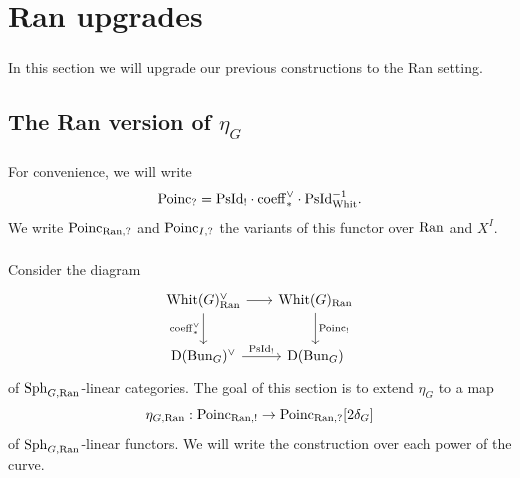 \section{Ran upgrades}
\label{section:Ran_upgrades}

\subsubsection{} In this section we will upgrade our previous constructions to the Ran setting.

\subsection{The Ran version of $\eta_G$}

\subsubsection{} For convenience, we will write
  \[\mathrm{Poinc}_? = \mathrm{PsId}_! \cdot \mathrm{coeff}_*^\vee \cdot \mathrm{PsId}_{\mathrm{Whit}}^{-1}.\]
We write $\mathrm{Poinc}_{\mathrm{Ran},?}$ and $\mathrm{Poinc}_{I,?}$ the variants of this functor over $\mathrm{Ran}$ and $X^I$.

\subsubsection{} Consider the diagram
\[
\begin{tikzcd}[
  column sep={8em,between origins},
  row sep={4em,between origins}
]
  \Whit(G)_\Ran^\vee \arrow[r] \arrow[d, "\coeff_*^\vee" left] & \Whit(G)_\Ran \arrow[d, "\Poinc_!"] \\
  \DMod(\Bun_G)^\vee \arrow[r, "\PsId_!"] & \DMod(\Bun_G)
\end{tikzcd}
\]
of $\mathrm{Sph}_{G,\mathrm{Ran}}$-linear categories. The goal of this section is to extend $\eta_G$ to a map
  \[\eta_{G,\mathrm{Ran}} : \mathrm{Poinc}_{\mathrm{Ran},!} \to \mathrm{Poinc}_{\mathrm{Ran}, ?} [2\delta_G]\]
of $\mathrm{Sph}_{G,\mathrm{Ran}}$-linear functors. We will write the construction over each power of the curve.

